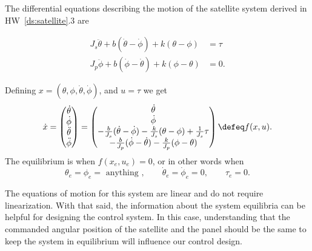
The differential equations describing the motion of the satellite system derived in HW~\ref{ds:satellite}.3 are

\begin{align} \label{eq:dm_diff_eq_mass}
J_s\ddot{\theta} + b(\dot{\theta}-\dot{\phi}) + k(\theta-\phi)  &= \tau \\
J_p\ddot{\phi} + b(\dot{\phi}-\dot{\theta}) + k(\phi-\theta) &= 0 .
\end{align}

Defining $x=(\theta, \phi, \dot{\theta}, \dot{\phi})$, and $u=\tau$ we get
\begin{align*}
\dot{x} = \begin{pmatrix} \dot{\theta} \\ \dot{\phi} \\ \ddot{\theta} \\ \ddot{\phi}\end{pmatrix} 
= \begin{pmatrix} \dot{\theta} \\ \dot{\phi} \\ -\frac{b}{J_s}(\dot{\theta}-\dot{\phi}) -\frac{k}{J_s}(\theta-\phi)+\frac{1}{J_s}\tau \\ - \frac{b}{J_p}(\dot{\phi}-\dot{\theta})-\frac{k}{J_p}(\phi-\theta) \end{pmatrix} \defeq f(x,u).
\end{align*}
The equilibrium is when $f(x_e,u_e)=0$, or in other words when
\begin{equation}\label{dm:satellite_equilibrium}
\theta_e = \phi_e = \text{~anything~}, \qquad \dot{\theta}_e = \dot{\phi}_e =0, \qquad \tau_e = 0.
\end{equation}

The equations of motion for this system are linear and do not require linearization. With that said, the information about the system equilibria can be helpful for designing the control system. In this case, understanding that the commanded angular position of the satellite and the panel should be the same to keep the system in equilibrium will influence our control design.

